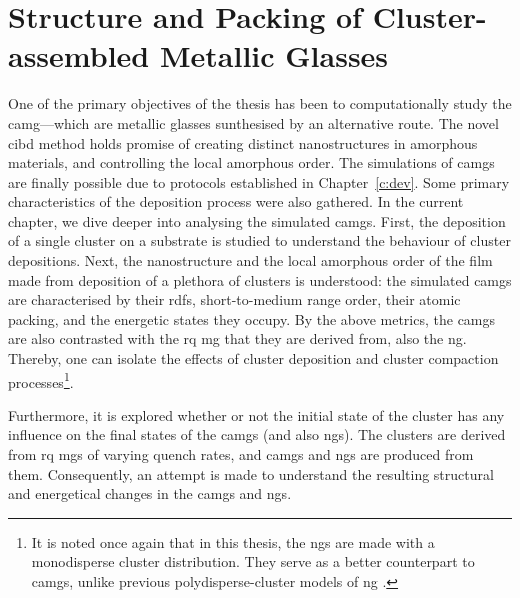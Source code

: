 \chapter{Structure and Packing of Cluster-assembled Metallic Glasses} \label{c:camg}
\scdeclaration

One of the primary objectives of the thesis has been to computationally study the \gls{camg}---which are metallic glasses sunthesised by an alternative route. The novel \gls{cibd} method holds promise of creating distinct nanostructures in amorphous materials, and controlling the local amorphous order. The simulations of \gls{camg}s are finally possible due to protocols established in Chapter~\ref{c:dev}. Some primary characteristics of the deposition process were also gathered. In the current chapter, we dive deeper into analysing the simulated \gls{camg}s. First, the deposition of a single cluster on a substrate is studied to understand the behaviour of cluster depositions. Next, the nanostructure and the local amorphous order of the film made from deposition of a plethora of clusters is understood: the simulated \gls{camg}s are characterised by their \gls{rdf}s, short-to-medium range order, their atomic packing, and the energetic states they occupy. By the above metrics, the \gls{camg}s are also contrasted with the \gls{rq} \gls{mg} that they are derived from, also the \gls{ng}. Thereby, one can isolate the effects of cluster deposition and cluster compaction processes\footnote{It is noted once again that in this thesis, the \gls{ng}s are made with a monodisperse cluster distribution. They serve as a better counterpart to \gls{camg}s, unlike previous polydisperse-cluster models of \gls{ng} \cite{Adjaoud2018}.}. \par

Furthermore, it is explored whether or not the initial state of the cluster has any influence on the final states of the \gls{camg}s (and also \gls{ng}s). The clusters are derived from \gls{rq} \gls{mg}s of varying quench rates, and \gls{camg}s and \gls{ng}s are produced from them. Consequently, an attempt is made to understand the resulting structural and energetical changes in the \gls{camg}s and \gls{ng}s. \par

%
